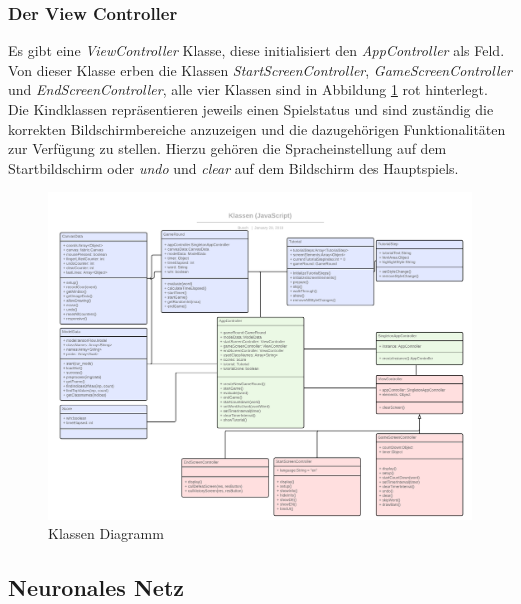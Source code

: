 \documentclass[11pt]{article}
\begin{document}
\subsubsection{Der View Controller}
Es gibt eine \textit{ViewController} Klasse, diese initialisiert den \textit{AppController} als Feld. Von dieser Klasse erben die Klassen \textit{StartScreenController}, \textit{GameScreenController} und \textit{EndScreenController}, alle vier Klassen sind in Abbildung \ref{fig:classDiagram} rot hinterlegt. Die Kindklassen repräsentieren jeweils einen Spielstatus und sind zuständig die korrekten Bildschirmbereiche anzuzeigen und die dazugehörigen Funktionalitäten zur Verfügung zu stellen. Hierzu gehören die Spracheinstellung auf dem Startbildschirm oder \textit{undo} und \textit{clear} auf dem Bildschirm des Hauptspiels.

\begin{figure}[ht]
\centering
\includegraphics[width=1\textwidth]{images/classDiagramSkribbl.png}
\caption{\label{fig:classDiagram}Klassen Diagramm}
\end{figure}

\newpage
\subsection{Neuronales Netz}
\end{document}
